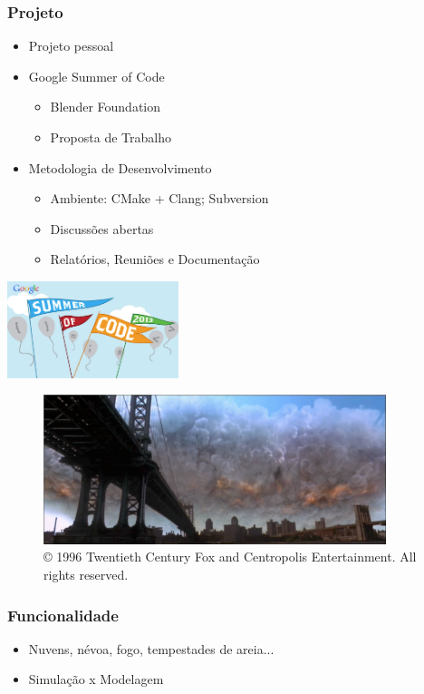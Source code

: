 \documentclass{beamer}
\begin{document}
\begin{frame}

\begin{multicols}{2}
\frametitle{Projeto}
\begin{itemize}
\item Projeto pessoal
\item Google Summer of Code
\begin{itemize}
    \item Blender Foundation
    \item Proposta de Trabalho
\end{itemize}

\item Metodologia de Desenvolvimento
\begin{itemize}
\item Ambiente: CMake + Clang; Subversion
\item Discussões abertas
\item Relatórios, Reuniões e Documentação
\end{itemize}
\end{itemize}
\begin{center}
\includegraphics[width=5cm]{gsoc}
\end{center}
\end{multicols}



\end{frame}

\begin{frame}

\begin{figure}[t]
\center
\includegraphics[width=10cm]{independenceDay}
\caption*{\tiny © 1996 Twentieth Century Fox and Centropolis Entertainment. All 
rights reserved.}
\end{figure}

\frametitle{Funcionalidade}
\begin{itemize}
\item Nuvens, névoa, fogo, tempestades de areia...
\item Simulação x Modelagem
\end{itemize}

\end{frame}
\end{document}
